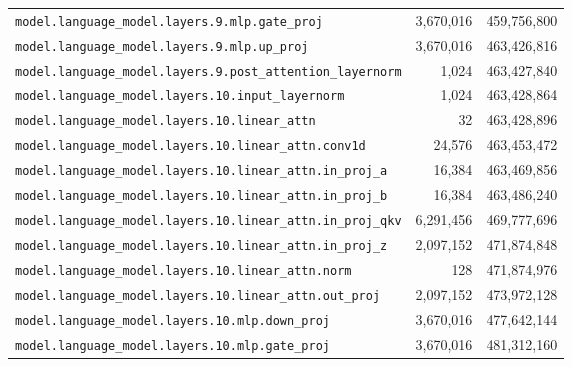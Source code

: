 \documentclass[10pt,a4paper]{article}
\theoremstyle{definition}
\begin{document}
\begin{appendices}
\begin{longtable}{p{9.5cm}rr}
\texttt{model.\allowbreak{}language\_model.\allowbreak{}layers.\allowbreak{}9.\allowbreak{}mlp.\allowbreak{}gate\_proj} & 3,670,016 & 459,756,800 \\
\texttt{model.\allowbreak{}language\_model.\allowbreak{}layers.\allowbreak{}9.\allowbreak{}mlp.\allowbreak{}up\_proj} & 3,670,016 & 463,426,816 \\
\texttt{model.\allowbreak{}language\_model.\allowbreak{}layers.\allowbreak{}9.\allowbreak{}post\_attention\_layernorm} & 1,024 & 463,427,840 \\
\texttt{model.\allowbreak{}language\_model.\allowbreak{}layers.\allowbreak{}10.\allowbreak{}input\_layernorm} & 1,024 & 463,428,864 \\
\texttt{model.\allowbreak{}language\_model.\allowbreak{}layers.\allowbreak{}10.\allowbreak{}linear\_attn} & 32 & 463,428,896 \\
\texttt{model.\allowbreak{}language\_model.\allowbreak{}layers.\allowbreak{}10.\allowbreak{}linear\_attn.\allowbreak{}conv1d} & 24,576 & 463,453,472 \\
\texttt{model.\allowbreak{}language\_model.\allowbreak{}layers.\allowbreak{}10.\allowbreak{}linear\_attn.\allowbreak{}in\_proj\_a} & 16,384 & 463,469,856 \\
\texttt{model.\allowbreak{}language\_model.\allowbreak{}layers.\allowbreak{}10.\allowbreak{}linear\_attn.\allowbreak{}in\_proj\_b} & 16,384 & 463,486,240 \\
\texttt{model.\allowbreak{}language\_model.\allowbreak{}layers.\allowbreak{}10.\allowbreak{}linear\_attn.\allowbreak{}in\_proj\_qkv} & 6,291,456 & 469,777,696 \\
\texttt{model.\allowbreak{}language\_model.\allowbreak{}layers.\allowbreak{}10.\allowbreak{}linear\_attn.\allowbreak{}in\_proj\_z} & 2,097,152 & 471,874,848 \\
\texttt{model.\allowbreak{}language\_model.\allowbreak{}layers.\allowbreak{}10.\allowbreak{}linear\_attn.\allowbreak{}norm} & 128 & 471,874,976 \\
\texttt{model.\allowbreak{}language\_model.\allowbreak{}layers.\allowbreak{}10.\allowbreak{}linear\_attn.\allowbreak{}out\_proj} & 2,097,152 & 473,972,128 \\
\texttt{model.\allowbreak{}language\_model.\allowbreak{}layers.\allowbreak{}10.\allowbreak{}mlp.\allowbreak{}down\_proj} & 3,670,016 & 477,642,144 \\
\texttt{model.\allowbreak{}language\_model.\allowbreak{}layers.\allowbreak{}10.\allowbreak{}mlp.\allowbreak{}gate\_proj} & 3,670,016 & 481,312,160 \\

\end{longtable}
\end{appendices}
\end{document}
